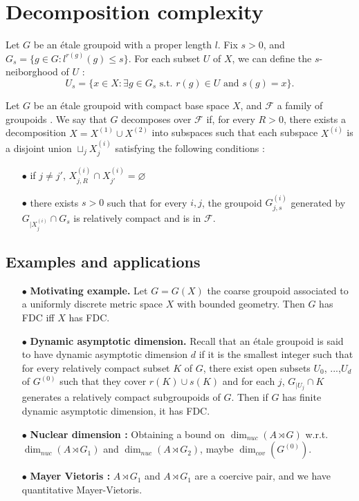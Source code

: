 \section{Decomposition complexity}

Let $G$ be an étale groupoid with a proper length $l$. Fix $s>0$, and $G_s=\{g\in G : l^{r(g)}(g)\leq s\}$. For each subset $U$ of $X$, we can define the $s$-neiborghood of $U$ :
\[U_s = \{x\in X : \exists g\in G_s \text{ s.t. } r(g)\in U \text{ and } s(g)=x \}.\]

\begin{definition}
Let $G$ be an étale groupoid with compact base space $X$, and $\mathcal F$ a family of groupoids . We say that $G$ decomposes over $\mathcal F$ if, for every $R>0$, there exists a decomposition $X=X^{(1)}\cup X^{(2)}$ into subspaces such that each subspace $X^{(i)}$ is a disjoint union $\sqcup_j X^{(i)}_j$ satisfying the following conditions :
\begin{itemize}
\item[$\bullet$] if $j\neq j'$,  $X^{(i)}_{j,R}\cap X^{(i)}_{j'}=\varnothing$
\item[$\bullet$] there exists $s>0$ such that for every $i,j$, the groupoid $G_{j,s}^{(i)}$ generated by $G_{|X^{(i)}_j}\cap G_s$ is relatively compact and is in $\mathcal F$.
\end{itemize}
\end{definition}

\subsection{Examples and applications}

\begin{itemize}
\item[$\bullet$] \textbf{Motivating example.} Let $G=G(X)$ the coarse groupoid associated to a uniformly discrete metric space $X$ with bounded geometry. Then $G$ has FDC iff $X$ has FDC.\\
\item[$\bullet$] \textbf{Dynamic asymptotic dimension.} Recall that an étale groupoid is said to have dynamic asymptotic dimension $d$ if it is the smallest integer such that for every relatively compact subset $K$ of $G$, there exist open subsets $U_0$, ...,$U_d$ of $G^{(0)}$ such that they cover $r(K)\cup s(K)$ and for each $j$, $G_{|U_j}\cap K$ generates a relatively compact subgroupoids of $G$. Then if $G$ has finite dynamic asymptotic dimension, it has FDC. 

\item[$\bullet$] \textbf{Nuclear dimension :} Obtaining a bound on $\dim_{nuc}(A\rtimes G)$ w.r.t. $\dim_{nuc} (A\rtimes G_1)$ and $\dim_{nuc} (A\rtimes G_2)$, maybe $\dim_{cov}(G^{(0)})$.
\item[$\bullet$] \textbf{Mayer Vietoris :} $A\rtimes G_1$ and $A\rtimes G_1$ are a coercive pair, and we have quantitative Mayer-Vietoris. 
\end{itemize}




